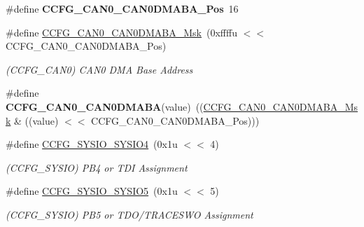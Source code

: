 \begin{DoxyCompactItemize}
\mbox{\label{group__SAME70__MATRIX_ga018f0f05779779fcfdaf7a7dc0c6b67c}} 
\#define {\bfseries C\+C\+F\+G\+\_\+\+C\+A\+N0\+\_\+\+C\+A\+N0\+D\+M\+A\+B\+A\+\_\+\+Pos}~16
\item 
\mbox{\label{group__SAME70__MATRIX_ga16ce309f038c92ae22b3b9ec99610d7c}} 
\#define \mbox{\hyperlink{group__SAME70__MATRIX_ga16ce309f038c92ae22b3b9ec99610d7c}{C\+C\+F\+G\+\_\+\+C\+A\+N0\+\_\+\+C\+A\+N0\+D\+M\+A\+B\+A\+\_\+\+Msk}}~(0xffffu $<$$<$ C\+C\+F\+G\+\_\+\+C\+A\+N0\+\_\+\+C\+A\+N0\+D\+M\+A\+B\+A\+\_\+\+Pos)
\begin{DoxyCompactList}\small\item\em (C\+C\+F\+G\+\_\+\+C\+A\+N0) C\+A\+N0 D\+MA Base Address \end{DoxyCompactList}\item 
\mbox{\label{group__SAME70__MATRIX_ga89c5d24cdba3123084ec2c465a9fdc07}} 
\#define {\bfseries C\+C\+F\+G\+\_\+\+C\+A\+N0\+\_\+\+C\+A\+N0\+D\+M\+A\+BA}(value)~((\mbox{\hyperlink{group__SAMV71__MATRIX_ga16ce309f038c92ae22b3b9ec99610d7c}{C\+C\+F\+G\+\_\+\+C\+A\+N0\+\_\+\+C\+A\+N0\+D\+M\+A\+B\+A\+\_\+\+Msk}} \& ((value) $<$$<$ C\+C\+F\+G\+\_\+\+C\+A\+N0\+\_\+\+C\+A\+N0\+D\+M\+A\+B\+A\+\_\+\+Pos)))
\item 
\mbox{\label{group__SAME70__MATRIX_ga59a09a374bab5cbed270d5aace8082bc}} 
\#define \mbox{\hyperlink{group__SAME70__MATRIX_ga59a09a374bab5cbed270d5aace8082bc}{C\+C\+F\+G\+\_\+\+S\+Y\+S\+I\+O\+\_\+\+S\+Y\+S\+I\+O4}}~(0x1u $<$$<$ 4)
\begin{DoxyCompactList}\small\item\em (C\+C\+F\+G\+\_\+\+S\+Y\+S\+IO) P\+B4 or T\+DI Assignment \end{DoxyCompactList}\item 
\mbox{\label{group__SAME70__MATRIX_ga7700a8793de58ee46189b3af593300ca}} 
\#define \mbox{\hyperlink{group__SAME70__MATRIX_ga7700a8793de58ee46189b3af593300ca}{C\+C\+F\+G\+\_\+\+S\+Y\+S\+I\+O\+\_\+\+S\+Y\+S\+I\+O5}}~(0x1u $<$$<$ 5)
\begin{DoxyCompactList}\small\item\em (C\+C\+F\+G\+\_\+\+S\+Y\+S\+IO) P\+B5 or T\+D\+O/\+T\+R\+A\+C\+E\+S\+WO Assignment \end{DoxyCompactList}\item 

\end{DoxyCompactItemize}
